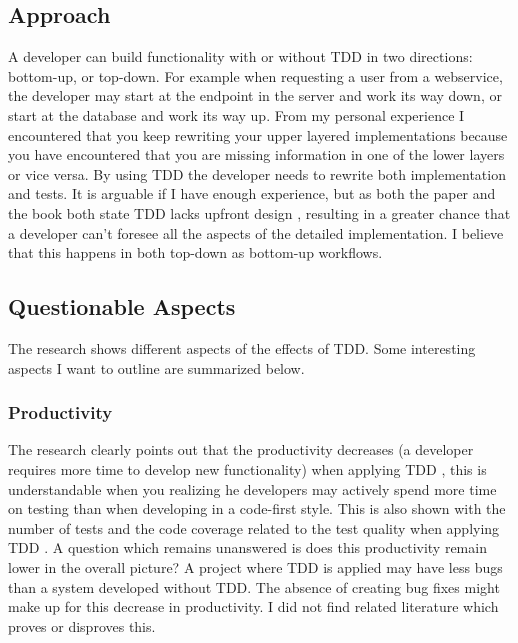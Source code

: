 \subsection*{Approach}

A developer can build functionality with or without TDD in two directions: bottom-up, or top-down. For example when
requesting a user from a webservice, the developer may start at the endpoint in the server and work its way down, or
start at the database and work its way up. From my personal experience I encountered that you keep rewriting your
upper layered implementations because you have encountered that you are missing information in one of the lower
layers or vice versa. By using TDD the developer needs to rewrite both implementation and tests. It is arguable if I
have enough experience, but as both the paper and the book both state TDD lacks upfront design \autocite[338]{SAC-J-2003-GeorgeW04} \autocite[212]{MAKING_SOFTWARE},
resulting in a
greater chance that a developer can't foresee all the aspects of the detailed implementation. I believe that this happens in both top-down as bottom-up workflows.

\subsection*{Questionable Aspects}

The research shows different aspects of the effects of TDD. Some interesting aspects I want to outline are summarized below.

\subsubsection*{Productivity}

The research clearly points out that the productivity decreases (a developer requires more time to develop new
functionality) when applying TDD \autocite[341]{SAC-J-2003-GeorgeW04} \autocite[213]{MAKING_SOFTWARE},
this is understandable when you realizing he developers may actively spend more time
on testing than when developing in a code-first style. This is also shown with the number of tests and the code
coverage related to the test quality when applying TDD \autocite[341]{SAC-J-2003-GeorgeW04}. A question which remains unanswered is does this
productivity remain lower in the overall picture? A project where TDD is applied may have less bugs than a system
developed without TDD. The absence of creating bug fixes might make up for this decrease in productivity. I did not
find related literature which proves or disproves this.

